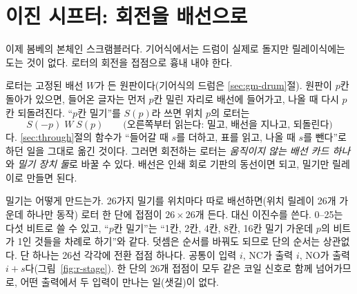 \section{이진 시프터: 회전을 배선으로}\label{sec:relay-shifter}

이제 봄베의 본체인 스크램블러다. 기어식에서는 드럼이 실제로 돌지만 릴레이식에는 도는 것이 없다. 로터의
회전을 접점으로 흉내 내야 한다.

\Why 로터는 고정된 배선 $W$가 든 원판이다(기어식의 드럼은 \ref{sec:gm-drum}절). 원판이 $p$칸 돌아가 있으면, 들어온 글자는 먼저 $p$칸 밀린 자리로
배선에 들어가고, 나올 때 다시 $p$칸 되돌려진다. ``$p$칸 밀기''를 $S(p)$라 쓰면 위치 $p$의 로터는
\[
  S(-p)\;W\;S(p) \qquad\text{(오른쪽부터 읽는다: 밀고, 배선을 지나고, 되돌린다)}
\]
다. \ref{sec:through}절의  함수가 ``들어갈 때 $s$를 더하고, 표를 읽고, 나올 때 $s$를 뺀다''로
하던 일을 그대로 옮긴 것이다.
그러면 회전하는 로터는 \emph{움직이지 않는 배선 카드 하나}와 \emph{밀기 장치 둘}로 바꿀 수 있다. 배선은
인쇄 회로 기판의 동선이면 되고, 밀기만 릴레이로 만들면 된다.

밀기는 어떻게 만드는가. 26가지 밀기를 위치마다 따로 배선하면(위치 릴레이 26개 가운데 하나만 동작) 로터 한
단에 접점이 $26 \times 26$개 든다. 대신 이진수를 쓴다. 0--25는 다섯 비트로 쓸 수 있고, ``$p$칸 밀기''는
``1칸, 2칸, 4칸, 8칸, 16칸 밀기 가운데 $p$의 비트가 1인 것들을 차례로 하기''와 같다. 덧셈은 순서를 바꿔도
되므로 단의 순서는 상관없다. 단 하나는 26선 각각에 전환 접점 하나다. 공통이 입력 $i$, NC가 출력 $i$, NO가
출력 $i+s$다(그림~\ref{fig:r-stage}). 한 단의 26개 접점이 모두 같은 코일 신호로 함께 넘어가므로, 어떤 출력에서
두 입력이 만나는 일(샛길)이 없다.

